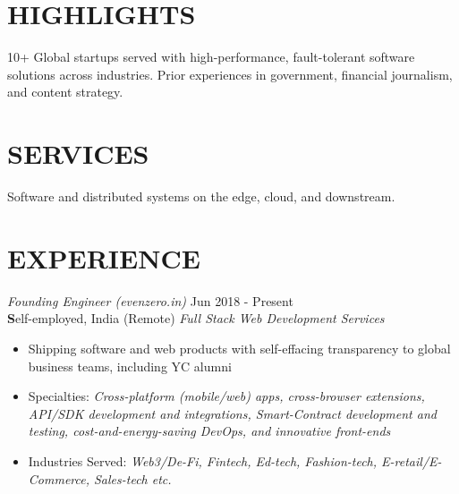 \documentclass[margin, 10pt]{res} %
\begin{document}
\begin{resume}

\section{\ttfamily HIGHLIGHTS}  

10+ Global startups served with high-performance, fault-tolerant software solutions across industries. Prior experiences in government, financial journalism, and content strategy.

\section{\ttfamily SERVICES} 

Software and distributed systems on the edge, cloud, and downstream. 
\section{\ttfamily EXPERIENCE}

{\sl Founding Engineer (evenzero.in)} \hfill Jun 2018 - \color{Green} Present\color{black}\\
\textbf Self-employed, India (Remote) \hfill {\scriptsize \it Full Stack Web Development Services}
\begin{itemize}\smallskip\smallskip
\item Shipping software and web products with self-effacing transparency to global business teams, including YC alumni 
\item Specialties: {\sl Cross-platform (mobile/web) apps, cross-browser extensions, API/SDK development and integrations, Smart-Contract development and testing, cost-and-energy-saving DevOps, and innovative front-ends} 
\item Industries Served: {\sl Web3/De-Fi, Fintech, Ed-tech, Fashion-tech, E-retail/E-Commerce, Sales-tech etc.} 


\end{itemize}
\end{resume}
\end{document}
